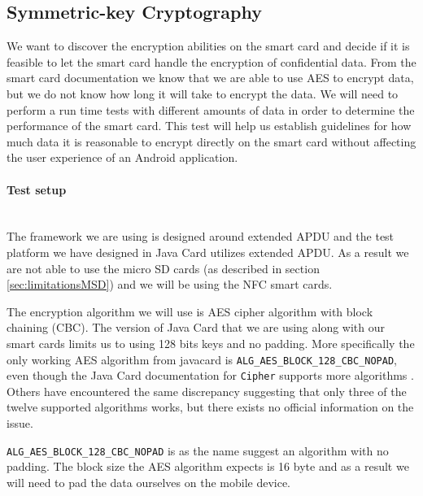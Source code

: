 \subsection{Symmetric-key Cryptography}
\label{sec:symmetricTest}
We want to discover the encryption abilities on the smart card and decide if it is feasible to let the smart card handle the encryption of confidential data. From the smart card documentation we know that we are able to use AES to encrypt data, but we do not know how long it will take to encrypt the data. We will need to perform a run time tests with different amounts of data in order to determine the performance of the smart card. This test will help us establish guidelines for how much data it is reasonable to encrypt directly on the smart card without affecting the user experience of an Android application.

\paragraph{Test setup}\mbox{}\\
The framework we are using is designed around extended APDU and the test platform we have designed in Java Card utilizes extended APDU. As a result we are not able to use the micro SD cards (as described in section \ref{sec:limitationsMSD}) and we will be using the NFC smart cards.

The encryption algorithm we will use is AES cipher algorithm with block chaining (CBC). The version of Java Card that we are using along with our smart cards limits us to using 128 bits keys and no padding. More specifically the only working AES algorithm from javacard is \texttt{ALG\_AES\_BLOCK\_128\_CBC\_NOPAD}, even though the Java Card documentation for \texttt{Cipher} supports more algorithms \cite{javacardCipher}. Others have encountered the same discrepancy \cite{javacardCipherFail} suggesting that only three of the twelve supported algorithms works, but there exists no official information on the issue.

\texttt{ALG\_AES\_BLOCK\_128\_CBC\_NOPAD} is as the name suggest an algorithm with no padding. The block size the AES algorithm expects is 16 byte and as a result we will need to pad the data ourselves on the mobile device.

